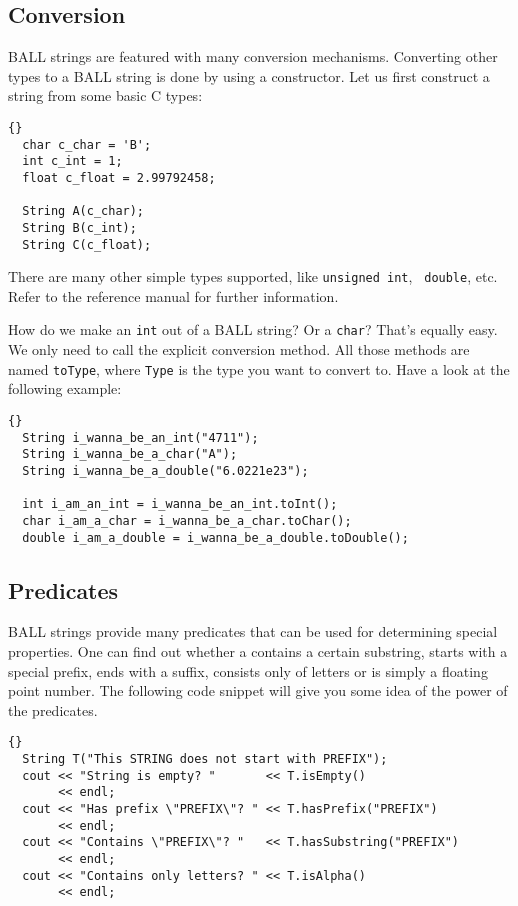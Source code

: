 \subsection{Conversion}

BALL strings are featured with many conversion mechanisms. Converting other
types to a BALL string is done by using a constructor. Let us first construct
a string from some basic C types:
\begin{lstlisting}{}
  char c_char = 'B';
  int c_int = 1;
  float c_float = 2.99792458;

  String A(c_char);
  String B(c_int);
  String C(c_float);
\end{lstlisting}
There are many other simple types supported, like {\tt unsigned int}, {\tt
double}, etc. Refer to the reference manual for further information.

How do we make an {\tt int} out of a BALL string? Or a {\tt char}? That's
equally easy. We only need to call the explicit conversion method. All those
methods are named {\tt toType}, where {\tt Type} is the type you want to
convert to. Have a look at the following example:
\begin{lstlisting}{}
  String i_wanna_be_an_int("4711");
  String i_wanna_be_a_char("A");
  String i_wanna_be_a_double("6.0221e23");

  int i_am_an_int = i_wanna_be_an_int.toInt();
  char i_am_a_char = i_wanna_be_a_char.toChar();
  double i_am_a_double = i_wanna_be_a_double.toDouble();
\end{lstlisting}


\subsection{Predicates}

BALL strings provide many predicates that can be used for determining special
properties. One can find out whether a  contains a certain 
substring, starts with a special prefix, ends with a suffix, consists only of 
letters or is simply a floating point number. The following code snippet will 
give you some idea of the power of the predicates.
\begin{lstlisting}{}
  String T("This STRING does not start with PREFIX");
  cout << "String is empty? "       << T.isEmpty()
       << endl;
  cout << "Has prefix \"PREFIX\"? " << T.hasPrefix("PREFIX")
       << endl;
  cout << "Contains \"PREFIX\"? "   << T.hasSubstring("PREFIX")
       << endl;
  cout << "Contains only letters? " << T.isAlpha()
       << endl;
\end{lstlisting}

